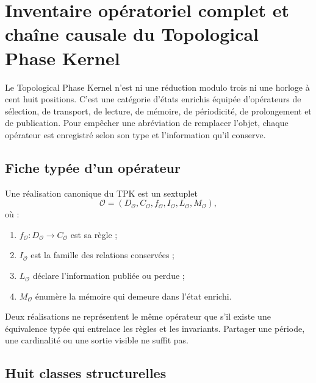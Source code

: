 
\chapter{Inventaire opératoriel complet et chaîne causale du Topological Phase Kernel}
\label{chap:inventario-operatorio-completo-tpk}

Le Topological Phase Kernel n’est ni une réduction modulo trois ni une horloge à
cent huit positions. C’est une catégorie d’états enrichis équipée
d’opérateurs de sélection, de transport, de lecture, de mémoire, de périodicité,
de prolongement et de publication. Pour empêcher une abréviation de remplacer
l’objet, chaque opérateur est enregistré selon son type et l’information qu’il
conserve.

\section{Fiche typée d'un opérateur}

\begin{definition}
\label{def:u006f-ficha-operatoria}
Une réalisation canonique du TPK est un sextuplet
\begin{equation}
 \mathcal O=
 (D_{\mathcal O},C_{\mathcal O},f_{\mathcal O},
 I_{\mathcal O},L_{\mathcal O},M_{\mathcal O}),
 \label{eq:u006f-ficha}
\end{equation}
où :
\begin{enumerate}
 \item \(f_{\mathcal O}:D_{\mathcal O}\to C_{\mathcal O}\) est sa règle ;
 \item \(I_{\mathcal O}\) est la famille des relations conservées ;
 \item \(L_{\mathcal O}\) déclare l’information publiée ou perdue ;
 \item \(M_{\mathcal O}\) énumère la mémoire qui demeure dans l’état
 enrichi.
\end{enumerate}
\end{definition}

Deux réalisations ne représentent le même opérateur que s’il existe une
équivalence typée qui entrelace les règles et les invariants. Partager une période,
une cardinalité ou une sortie visible ne suffit pas.

\section{Huit classes structurelles}

